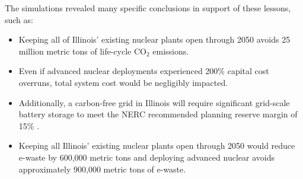 The simulations revealed many specific conclusions in support of these lessons, 
such as:
\begin{itemize}
        \item Keeping all of Illinois' existing nuclear plants open through 
                2050 avoids 25 million metric tons of life-cycle CO$_2$ emissions. 
        \item Even if advanced nuclear deployments experienced 200\% capital 
                cost overruns, total system cost would be negligibly impacted.
        \item Additionally, a carbon-free grid in Illinois will require 
                significant grid-scale battery storage to meet the \gls{NERC} 
                recommended planning reserve margin of 15\% 
                \cite{nerc_reserve_margin}.
        \item Keeping all Illinois' existing nuclear plants open through 2050 
                would reduce e-waste by 600,000 metric tons and deploying 
                advanced nuclear avoids approximately 900,000 metric tons of 
                e-waste. 
\end{itemize}





